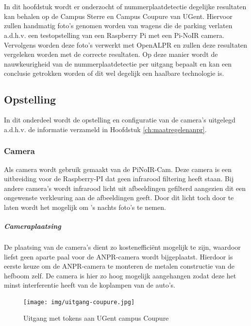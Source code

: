 
\chapter{}
\label{ch:praktischeUitvoering}
In dit hoofdstuk wordt er onderzocht of nummerplaatdetectie degelijke resultaten kan behalen op de Campus Sterre en Campus Coupure van UGent. Hiervoor zullen handmatig foto's genomen worden van wagens die de parking verlaten a.d.h.v. een testopstelling van een Raspberry Pi met een Pi-NoIR camera. Vervolgens worden deze foto's verwerkt met OpenALPR en zullen deze resultaten vergeleken worden met de correcte resultaten. Op deze manier wordt de nauwkeurigheid van de nummerplaatdetectie per uitgang bepaalt en kan een conclusie getrokken worden of dit wel degelijk een haalbare technologie is.

\section{Opstelling}
In dit onderdeel wordt de opstelling en configuratie van de camera's uitgelegd a.d.h.v. de informatie verzameld in Hoofdstuk \ref{ch:maatregelenanpr}.

\subsection{Camera}
Als camera wordt gebruik gemaakt van de PiNoIR-Cam. Deze camera is een uitbreiding voor de Raspberry-PI dat geen infrarood filtering heeft staan. Bij andere camera's wordt infrarood licht uit afbeeldingen gefilterd aangezien dit een ongewenste verkleuring aan de afbeeldingen geeft. Door dit licht toch door te laten wordt het mogelijk om 's nachts foto's te nemen.

\paragraph{Cameraplaatsing}
De plaatsing van de camera's dient zo kostenefficiënt mogelijk te zijn, waardoor liefst geen aparte paal voor de ANPR-camera wordt bijgeplaatst. Hierdoor is eerste keuze om de ANPR-camera te monteren de metalen constructie van de hefboom zelf. De camera is hier zo hoog mogelijk aangehangen zodat deze het minst interferentie heeft van de koplampen van de auto's.

\begin{figure}[h!]
	\centering
	\texttt{[image: img/uitgang-coupure.jpg]}
	\caption{Uitgang met tokens aan UGent campus Coupure}
\end{figure}


